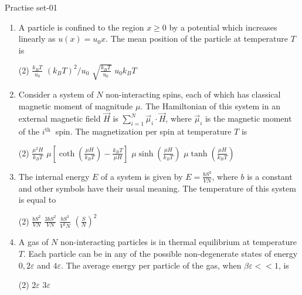 \newpage
\begin{abox}
	Practise set-01
\end{abox}
\begin{enumerate}
	\item A particle is confined to the region $x \geq 0$ by a potential which increases linearly as $u(x)=u_{0} x$. The mean position of the particle at temperature $T$ is
	{	}
	 \begin{tasks}(2)
		\task[\textbf{a.}] $\frac{k_{B} T}{u_{0}}$
		\task[\textbf{b.}]$\left(k_{B} T\right)^{2} / u_{0}$
		\task[\textbf{c.}]$\sqrt{\frac{k_{B} T}{u_{0}}}$
		\task[\textbf{d.}]  $u_{0} k_{B} T$
	\end{tasks}
\item 	Consider a system of $N$ non-interacting spins, each of which has classical magnetic moment of magnitude $\mu$. The Hamiltonian of this system in an external magnetic field $\vec{H}$ is $\sum_{i=1}^{N} \vec{\mu}_{i} \cdot \vec{H}$, where $\vec{\mu}_{i}$ is the magnetic moment of the $i^{\text {th }}$ spin. The magnetization per spin at temperature $T$ is
{	}
	 \begin{tasks}(2)
		\task[\textbf{a.}]$\frac{\mu^{2} H}{k_{B} T}$
		\task[\textbf{b.}]$\mu\left[\operatorname{coth}\left(\frac{\mu H}{k_{B} T}\right)-\frac{k_{B} T}{\mu H}\right]$
		\task[\textbf{c.}] $\mu \sinh \left(\frac{\mu H}{k_{B} T}\right)$
		\task[\textbf{d.}] $\mu \tanh \left(\frac{\mu H}{k_{B} T}\right)$
	\end{tasks}
\item 	The internal energy $E$ of a system is given by $E=\frac{b S^{3}}{V N}$, where $b$ is a constant and other symbols have their usual meaning. The temperature of this system is equal to
{	}
	 \begin{tasks}(2)
		\task[\textbf{a.}]$\frac{b S^{2}}{V N}$
		\task[\textbf{b.}]$\frac{3 b S^{2}}{V N}$
		\task[\textbf{c.}]$\frac{b S^{3}}{V^{2} N}$
		\task[\textbf{d.}] $\left(\frac{S}{N}\right)^{2}$
	\end{tasks}
\item A gas of $N$ non-interacting particles is in thermal equilibrium at temperature $T$. Each particle can be in any of the possible non-degenerate states of energy $0,2 \varepsilon$ and $4 \varepsilon$. The average energy per particle of the gas, when $\beta \varepsilon<<1$, is
{	}
 \begin{tasks}(2)
	\task[\textbf{a.}]$2 \varepsilon$
	\task[\textbf{b.}] $3 \varepsilon$

\end{tasks}
\end{enumerate}
